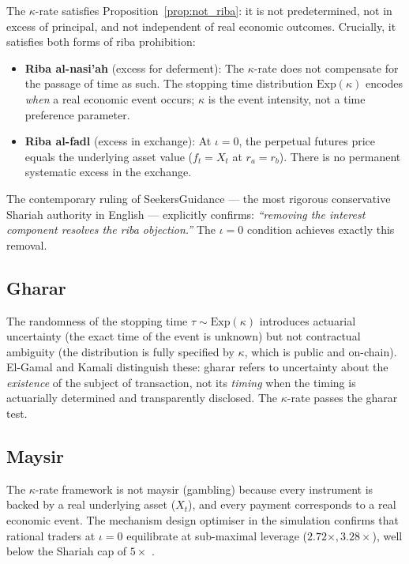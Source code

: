 \documentclass[10pt,twocolumn]{article}
\theoremstyle{plain}
\theoremstyle{definition}
\begin{document}
The $\kappa$-rate satisfies Proposition~\ref{prop:not_riba}: it
is not predetermined, not in excess of principal, and not
independent of real economic outcomes. Crucially, it satisfies
both forms of riba prohibition:
\begin{itemize}[leftmargin=*,noitemsep]
\item \textbf{Riba al-nasi'ah} (excess for deferment): The
$\kappa$-rate does not compensate for the passage of time
as such. The stopping time distribution $\mathrm{Exp}(\kappa)$
encodes \emph{when} a real economic event occurs; $\kappa$
is the event intensity, not a time preference parameter.
\item \textbf{Riba al-fadl} (excess in exchange): At $\iota = 0$,
the perpetual futures price equals the underlying asset value
($f_t = X_t$ at $r_a = r_b$). There is no permanent systematic
excess in the exchange.
\end{itemize}

The contemporary ruling of SeekersGuidance \cite{SeekersGuidance2025}
--- the most rigorous conservative Shariah authority in English
--- explicitly confirms: \textit{``removing the interest component
resolves the riba objection.''} The $\iota = 0$ condition achieves
exactly this removal.

\subsection{Gharar}

The randomness of the stopping time $\tau \sim \mathrm{Exp}(\kappa)$
introduces actuarial uncertainty (the exact time of the event is
unknown) but not contractual ambiguity (the distribution is fully
specified by $\kappa$, which is public and on-chain). El-Gamal
\cite{ElGamal2006} and Kamali \cite{Kamali2007} distinguish
these: gharar refers to uncertainty about the \emph{existence}
of the subject of transaction, not its \emph{timing} when the
timing is actuarially determined and transparently disclosed.
The $\kappa$-rate passes the gharar test.

\subsection{Maysir}

The $\kappa$-rate framework is not maysir (gambling) because every
instrument is backed by a real underlying asset ($X_t$), and every
payment corresponds to a real economic event. The mechanism design
optimiser in the simulation \cite{Ahmed2026c} confirms that
rational traders at $\iota = 0$ equilibrate at sub-maximal
leverage ($2.72\times, 3.28\times$), well below the Shariah cap
of $5\times$ \cite{Ahmed2026a}.
\end{document}
